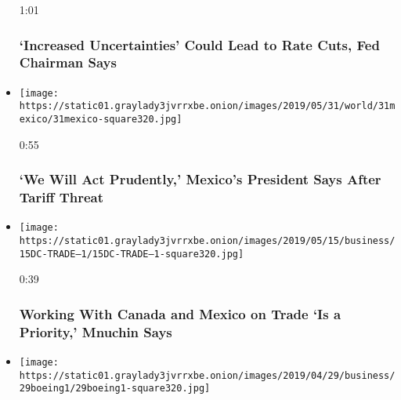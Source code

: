\begin{itemize}
  1:01

  \hypertarget{increased-uncertainties-could-lead-to-rate-cuts-fed-chairman-says}{%
  \subsubsection{`Increased Uncertainties' Could Lead to Rate Cuts, Fed
  Chairman
  Says}\label{increased-uncertainties-could-lead-to-rate-cuts-fed-chairman-says}}
\item
  \href{https://www.nytimes3xbfgragh.onion/video/world/americas/100000006534533/trump-mexico-tariffs.html?action=click\&module=video-series-bar\&region=header\&pgtype=Article\&playlistId=video/business}{}

  \texttt{[image: https://static01.graylady3jvrrxbe.onion/images/2019/05/31/world/31mexico/31mexico-square320.jpg]}

  0:55

  \hypertarget{we-will-act-prudently-mexicos-president-says-after-tariff-threat}{%
  \subsubsection{`We Will Act Prudently,' Mexico's President Says After
  Tariff
  Threat}\label{we-will-act-prudently-mexicos-president-says-after-tariff-threat}}
\item
  \href{https://www.nytimes3xbfgragh.onion/video/business/100000006510791/mnuchin-canada-mexico-trade.html?action=click\&module=video-series-bar\&region=header\&pgtype=Article\&playlistId=video/business}{}

  \texttt{[image: https://static01.graylady3jvrrxbe.onion/images/2019/05/15/business/15DC-TRADE--1/15DC-TRADE--1-square320.jpg]}

  0:39

  \hypertarget{working-with-canada-and-mexico-on-trade-is-a-priority-mnuchin-says}{%
  \subsubsection{Working With Canada and Mexico on Trade `Is a
  Priority,' Mnuchin
  Says}\label{working-with-canada-and-mexico-on-trade-is-a-priority-mnuchin-says}}
\item
  \href{https://www.nytimes3xbfgragh.onion/video/business/100000006484256/boeing-ceo-safety.html?action=click\&module=video-series-bar\&region=header\&pgtype=Article\&playlistId=video/business}{}

  \texttt{[image: https://static01.graylady3jvrrxbe.onion/images/2019/04/29/business/29boeing1/29boeing1-square320.jpg]}


\end{itemize}
